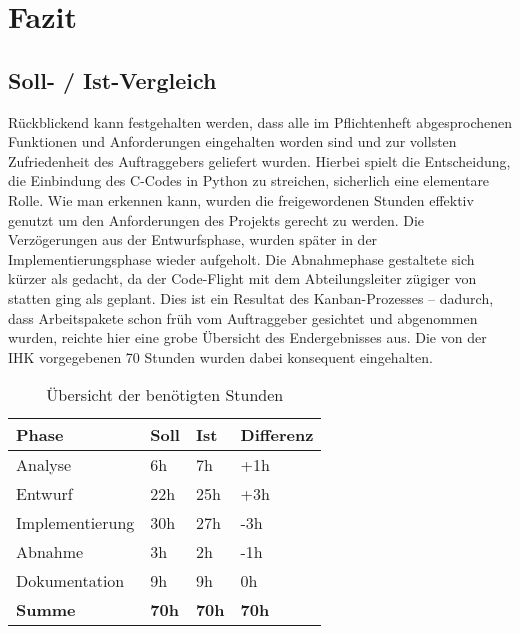 \section{Fazit}
\label{section:postmortem}
\subsection{Soll- / Ist-Vergleich}
Rückblickend kann festgehalten werden, dass alle im Pflichtenheft
abgesprochenen Funktionen und Anforderungen eingehalten worden sind
und zur vollsten Zufriedenheit des Auftraggebers geliefert wurden. Hierbei
spielt die Entscheidung, die Einbindung des C-Codes in Python zu streichen, sicherlich
eine elementare Rolle. Wie man erkennen kann, wurden die freigewordenen Stunden effektiv
genutzt um den Anforderungen des Projekts gerecht zu werden. Die Verzögerungen
aus der Entwurfsphase, wurden später in der Implementierungsphase wieder aufgeholt.
Die Abnahmephase gestaltete sich kürzer als gedacht, da der Code-Flight mit dem
Abteilungsleiter zügiger von statten ging als geplant. Dies ist ein Resultat des
Kanban-Prozesses -- dadurch, dass Arbeitspakete schon früh vom Auftraggeber
gesichtet und abgenommen wurden, reichte hier eine grobe Übersicht des Endergebnisses
aus. Die von der IHK vorgegebenen 70 Stunden wurden dabei konsequent eingehalten.


\begin{table}[!htp]
    \centering
    \caption{Übersicht der benötigten Stunden}
    \label{tabelle:sollist}
    \begin{tabular}{llll}
        \hline
        \rowcolor[HTML]{9698ED}
        {\color[HTML]{FFFFFF} \textbf{Phase}} & {\color[HTML]{FFFFFF} \textbf{Soll}} & {\color[HTML]{FFFFFF} \textbf{Ist}} & {\color[HTML]{FFFFFF} \textbf{Differenz}} \\ \hline
        Analyse                               & 6h                                   & 7h                                  & +1h                                       \\
        \rowcolor[HTML]{BBDAFF}
        Entwurf                               & 22h                                  & 25h                                 & +3h                                       \\
        Implementierung                       & 30h                                  & 27h                                 & -3h                                       \\
        \rowcolor[HTML]{BBDAFF}
        Abnahme                               & 3h                                   & 2h                                  & -1h                                       \\
        Dokumentation                         & 9h                                   & 9h                                  & 0h                                        \\ \hline
        \rowcolor[HTML]{9698ED}
        {\color[HTML]{FFFFFF} \textbf{Summe}} & {\color[HTML]{FFFFFF} \textbf{70h}}  & {\color[HTML]{FFFFFF} \textbf{70h}} & {\color[HTML]{FFFFFF} \textbf{70h}}       \\ \hline
    \end{tabular}
\end{table}

